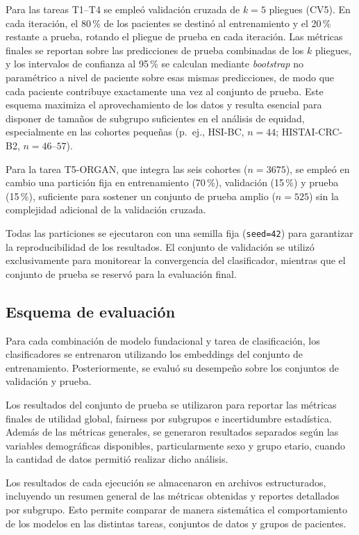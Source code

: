 Para las tareas T1--T4 se empleó validación cruzada de $k=5$ pliegues (CV5). En cada iteración, el 80\,\% de los pacientes se destinó al entrenamiento y el 20\,\% restante a prueba, rotando el pliegue de prueba en cada iteración. Las métricas finales se reportan sobre las predicciones de prueba combinadas de los $k$ pliegues, y los intervalos de confianza al 95\,\% se calculan mediante \textit{bootstrap} no paramétrico a nivel de paciente sobre esas mismas predicciones, de modo que cada paciente contribuye exactamente una vez al conjunto de prueba. Este esquema maximiza el aprovechamiento de los datos y resulta esencial para disponer de tamaños de subgrupo suficientes en el análisis de equidad, especialmente en las cohortes pequeñas (p.\ ej., HSI-BC, $n=44$; HISTAI-CRC-B2, $n=46$--$57$).

Para la tarea T5-ORGAN, que integra las seis cohortes ($n=3675$), se empleó en cambio una partición fija en entrenamiento (70\,\%), validación (15\,\%) y prueba (15\,\%), suficiente para sostener un conjunto de prueba amplio ($n=525$) sin la complejidad adicional de la validación cruzada.

Todas las particiones se ejecutaron con una semilla fija (\texttt{seed=42}) para garantizar la reproducibilidad de los resultados. El conjunto de validación se utilizó exclusivamente para monitorear la convergencia del clasificador, mientras que el conjunto de prueba se reservó para la evaluación final.

\subsection{Esquema de evaluación}
\label{subsec:esquema-validacion}

Para cada combinación de modelo fundacional y tarea de clasificación, los
clasificadores se entrenaron utilizando los embeddings del conjunto de
entrenamiento. Posteriormente, se evaluó su desempeño sobre los conjuntos de
validación y prueba.

Los resultados del conjunto de prueba se utilizaron para reportar las
métricas finales de utilidad global, fairness por subgrupos e incertidumbre
estadística. Además de las
métricas generales, se generaron resultados separados según las variables
demográficas disponibles, particularmente sexo y grupo etario, cuando la
cantidad de datos permitió realizar dicho análisis.

Los resultados de cada ejecución se almacenaron en archivos estructurados,
incluyendo un resumen general de las métricas obtenidas y reportes detallados
por subgrupo. Esto permite comparar de manera sistemática el comportamiento
de los modelos en las distintas tareas, conjuntos de datos y grupos de
pacientes.

